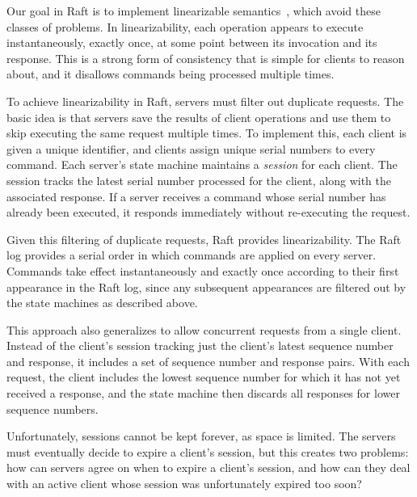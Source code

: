 Our goal in Raft is to implement linearizable semantics~\cite{Herlihy:1990}, which avoid
these classes of problems. In linearizability, each operation appears to
execute instantaneously, exactly once, at some point between its
invocation and its response. This is a strong form of consistency that
is simple for clients to reason about, and it disallows commands being
processed multiple times.

To achieve linearizability in Raft, servers must filter out duplicate
requests. The basic idea is that servers save the results of
client operations and use them to skip executing the same request
multiple times.
To implement this, each client is given a unique
identifier, and clients assign unique serial numbers to every command.
Each server's state machine maintains a \emph{session} for each client.
The session tracks the latest serial number processed for the
client, along with the associated response. If a server receives a command
whose serial number has already been executed, it responds immediately
without re-executing the request.

Given this filtering of duplicate requests, Raft
provides linearizability. The Raft log provides a serial order in which
commands are applied on every server. Commands take effect
instantaneously and exactly once according to their first appearance in
the Raft log, since any subsequent appearances are filtered out by the
state machines as described above.

This approach also generalizes to allow concurrent requests from a
single client. Instead of the client's session tracking just the
client's latest sequence number and response, it includes a set of
sequence number and response pairs. With each request, the client
includes the lowest sequence number for which it has not yet received a
response, and the state machine then discards all responses for lower
sequence numbers.



Unfortunately, sessions cannot be kept forever, as space is
limited. The servers must eventually decide to expire a client's
session, but this creates two problems: how can servers agree on when to
expire a client's session, and how can they deal with an active client
whose session was unfortunately expired too soon?

